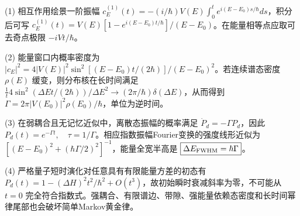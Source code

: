 (1) 相互作用绘景一阶振幅 \(c_E^{(1)}(t)=-(i/\hbar)V(E)\int_0^t e^{i(E-E_0)s/\hbar}ds\)，积分后可写 \(c_E^{(1)}(t)=V(E)[1-e^{i(E-E_0)t/\hbar}]/(E-E_0)\)。在能量相等点应取可去奇点极限 \(-iVt/\hbar\)。

(2) 能量窗口内概率密度为 \(|c_E|^2=4|V(E)|^2\sin^2[(E-E_0)t/(2\hbar)]/(E-E_0)^2\)。若连续谱态密度 \(\rho(E)\) 缓变，则分布核在长时间满足 \(\frac1t4\sin^2(\Delta Et/(2\hbar))/\Delta E^2\to(2\pi/\hbar)\delta(\Delta E)\)，从而得到 \(\boxed{\Gamma=2\pi|V(E_0)|^2\rho(E_0)/\hbar}\)，单位为逆时间。

(3) 在弱耦合且无记忆近似中，离散态振幅的概率满足 \(\dot P_d=-\Gamma P_d\)，因此 \(\boxed{P_d(t)=e^{-\Gamma t},\quad\tau=1/\Gamma}\)。相应指数振幅Fourier变换的强度线形近似为 \([ (E-E_0)^2+(\hbar\Gamma/2)^2]^{-1}\)，能量全宽半高是 \(\boxed{\Delta E_{\rm FWHM}=\hbar\Gamma}\)。

(4) 严格量子短时演化对任意具有有限能量方差的初态有 \(P_d(t)=1-(\Delta H)^2t^2/\hbar^2+O(t^3)\)，故初始瞬时衰减斜率为零，不可能从 \(t=0\) 完全符合指数式。强耦合、有限谱边、带隙、强能量依赖态密度和长时间幂律尾部也会破坏简单Markov黄金律。
